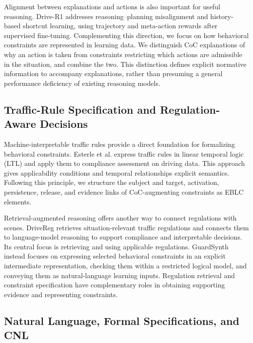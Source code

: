 \documentclass[nolineno]{ieeeaccess}
\begin{document}
Alignment between explanations and actions is also important for useful reasoning. Drive-R1 addresses reasoning--planning misalignment and history-based shortcut learning, using trajectory and meta-action rewards after supervised fine-tuning. Complementing this direction, we focus on how behavioral constraints are represented in learning data. We distinguish CoC explanations of why an action is taken from constraints restricting which actions are admissible in the situation, and combine the two. This distinction defines explicit normative information to accompany explanations, rather than presuming a general performance deficiency of existing reasoning models. \cite{r5}\par

\subsection{Traffic-Rule Specification and Regulation-Aware Decisions}

Machine-interpretable traffic rules provide a direct foundation for formalizing behavioral constraints. Esterle et al. express traffic rules in linear temporal logic (LTL) and apply them to compliance assessment on driving data. This approach gives applicability conditions and temporal relationships explicit semantics. Following this principle, we structure the subject and target, activation, persistence, release, and evidence links of CoC-augmenting constraints as EBLC elements. \cite{r6}\par

Retrieval-augmented reasoning offers another way to connect regulations with scenes. DriveReg retrieves situation-relevant traffic regulations and connects them to language-model reasoning to support compliance and interpretable decisions. Its central focus is retrieving and using applicable regulations. GuardSynth instead focuses on expressing selected behavioral constraints in an explicit intermediate representation, checking them within a restricted logical model, and conveying them as natural-language learning inputs. Regulation retrieval and constraint specification have complementary roles in obtaining supporting evidence and representing constraints. \cite{r7}\par

\subsection{Natural Language, Formal Specifications, and CNL}
\end{document}
